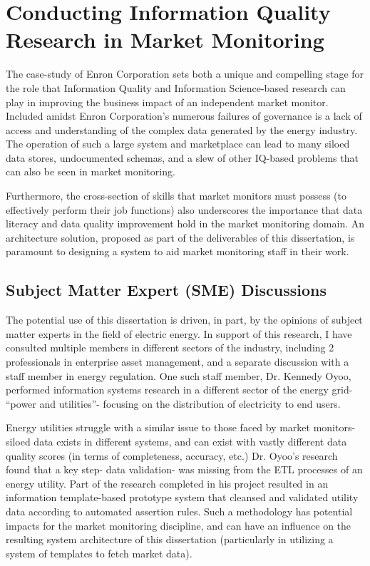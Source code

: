 \section{Conducting Information Quality Research in Market Monitoring}

The case-study of Enron Corporation sets both a unique and compelling stage for the role that Information Quality and Information Science-based research can play in improving the business impact of an independent market monitor. Included amidst Enron Corporation’s numerous failures of governance is a lack of access and understanding of the complex data generated by the energy industry. The operation of such a large system and marketplace can lead to many siloed data stores, undocumented schemas, and a slew of other IQ-based problems that can also be seen in market monitoring.

Furthermore, the cross-section of skills that market monitors must possess (to effectively perform their job functions) also underscores the importance that data literacy and data quality improvement hold in the market monitoring domain. An architecture solution, proposed as part of the deliverables of this dissertation, is paramount to designing a system to aid market monitoring staff in their work.

\subsection{Subject Matter Expert (SME) Discussions}

The potential use of this dissertation is driven, in part, by the opinions of subject matter experts in the field of electric energy. In support of this research, I have consulted multiple members in different sectors of the industry, including 2 professionals in enterprise asset management, and a separate discussion with a staff member in energy regulation. One such staff member, Dr. Kennedy Oyoo, performed information systems research in a different sector of the energy grid- “power and utilities”- focusing on the distribution of electricity to end users.

Energy utilities struggle with a similar issue to those faced by market monitors- siloed data exists in different systems, and can exist with vastly different data quality scores (in terms of completeness, accuracy, etc.) Dr. Oyoo’s research found that a key step- data validation- was missing from the ETL processes of an energy utility. Part of the research completed in his project resulted in an information template-based prototype system that cleansed and validated utility data according to automated assertion rules. Such a methodology has potential impacts for the market monitoring discipline, and can have an influence on the resulting system architecture of this dissertation (particularly in utilizing a system of templates to fetch market data).
